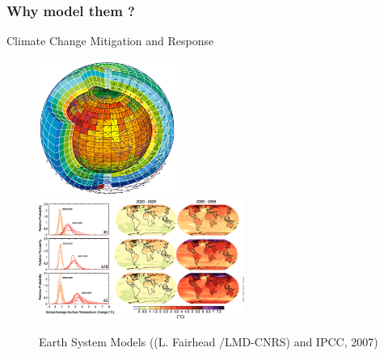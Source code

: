 \documentclass{beamer}
\begin{document}
	\begin{frame}
		\frametitle{Why model them ?}
		\begin{block}{Climate Change Mitigation and Response}
				\begin{figure}				
\centering
		    	\includegraphics[width=0.4\textwidth]{ESM.png}
		    	\includegraphics[width=0.6\textwidth]{ch1.png}		    	    
				\caption{Earth System Models ((L. Fairhead /LMD-CNRS) and IPCC, 2007)}
		    	\end{figure}
		\end{block}
	\end{frame}
\end{document}
